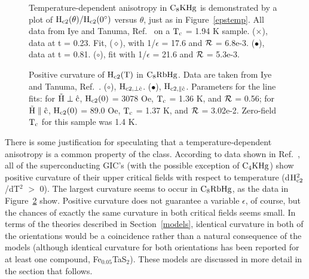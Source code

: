 \begin{figure}
\vspace{5in}
\caption[Temperature-dependent anisotropy in $\rm
C_8KHg$.]{Temperature-dependent anisotropy in $\rm  C_8KHg$ is demonstrated
by a  plot of $\rm  H_{c2}(\theta)/H_{c2}(0^{\circ})$ versus $\theta$, just
as     in  Figure~\ref{epstemp}.    All  data    from   Iye  and    Tanuma,
Ref.~\cite{tanuma81} on a $\rm T_c$ = 1.94 K sample.  ($\times$), data at t
= 0.23.  Fit, ($\diamond$), with 1/$\epsilon$ = 17.6 and $\cal R$ = 6.8e-3.
($\bullet$), data at t = 0.81.  ($\circ$), fit with 1/$\epsilon$ = 21.6 and
$\cal R$ = 5.3e-3.}
\label{stiiepstemp}
\end{figure}

\begin{figure}
\vspace{5.5in}
\caption[Positive curvature of $\rm H_{c2}(T)$  in $\rm C_8RbHg$.]{Positive
curvature of $\rm H_{c2}(T)$ in $\rm C_8RbHg$.  Data are taken  from Iye and
Tanuma,    Ref.~\cite{iye82}.  ($\circ$),  $\rm  H_{c2,  \perp   \hat{c}}$.
($\bullet$),   $\rm H_{c2,  \parallel   \hat{c}}$.  Parameters for the line
fits: for $\rm \vec{H} \perp \hat{c}$, $\rm H_{c2}(0)$ =  3078 Oe, $\rm T_c$
= 1.36 K, and $\cal  R$ = 0.56;  for $\rm \vec{H} \parallel \hat{c}$,  $\rm
H_{c2}(0)$ = 89.0  Oe,  $\rm  T_c$  = 1.37 K,    and $\cal R$    =  3.02e-2.
Zero-field $\rm T_c$ for this sample was 1.4 K.\cite{iye82}}
\label{rbhct}
\end{figure}

        There  is     some  justification   for      speculating   that   a
temperature-dependent anisotropy  is    a common  property   of the  class.
According to  data shown  in Ref.~\cite{iye82},  all of the superconducting
GIC's (with the possible exception of $\rm C_4KHg$) show positive curvature
of their   upper critical     fields with  respect   to temperature  (d$\rm
H_{c2}^2$/dT$^2$ $>$  0).  The  largest  curvature seems  to occur  in $\rm
C_8RbHg$, as the data in Figure~\ref{rbhct} show.  Positive  curvature does
not guarantee a variable $\epsilon$, of  course, but the chances of exactly
the same curvature in  both critical  fields seems small.   In terms of the
theories described in  Section~\ref{models}, identical curvature in both of
the orientations would be a  coincidence  rather than a natural consequence
of the models (although identical curvature for both orientations  has been
reported for at   least one compound,  Fe$_{0.05}$TaS$_2$\cite{coleman83}).
These models are discussed in more detail in the section that follows.

